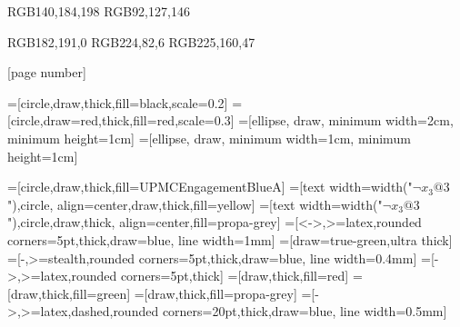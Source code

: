 

\definecolor{UPMCEngagementBlueA} {RGB}{140,184,198}
\definecolor{UPMCEngagementBlueB} {RGB}{92,127,146}

\definecolor{UPMCCorporateGreen} {RGB}{182,191,0}
\definecolor{UPMCExcellenceOrangeA} {RGB}{224,82,6}
\definecolor{UPMCExcellenceOrangeB} {RGB}{225,160,47}

 {
  [page number]{}
  \beamertemplatenavigationsymbolsempty
}


=[circle,draw,thick,fill=black,scale=0.2]
=[circle,draw=red,thick,fill=red,scale=0.3]
=[ellipse, draw, minimum width=2cm, minimum height=1cm]
=[ellipse, draw, minimum width=1cm, minimum height=1cm]

=[circle,draw,thick,fill=UPMCEngagementBlueA]
=[text width={width("$\neg x_3@3$")},circle,
align=center,draw,thick,fill=yellow]
=[text width={width("$\neg x_3@3$")},circle,draw,thick,
align=center,fill=propa-grey]
=[<->,>=latex,rounded corners=5pt,thick,draw=blue, line width=1mm]
=[draw=true-green,ultra thick]
=[-,>=stealth,rounded corners=5pt,thick,draw=blue, line width=0.4mm]
=[->,>=latex,rounded corners=5pt,thick]
=[draw,thick,fill=red]
=[draw,thick,fill=green]
=[draw,thick,fill=propa-grey]
=[->,>=latex,dashed,rounded corners=20pt,thick,draw=blue, line width=0.5mm]

